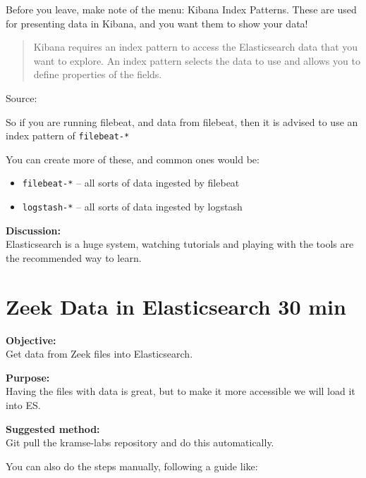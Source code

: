 \documentclass[a4paper,11pt,notitlepage]{report}
\begin{document}
Before you leave, make note of the menu: Kibana Index Patterns. These are used for presenting data in Kibana, and you want them to show your data!

\begin{quote}
Kibana requires an index pattern to access the Elasticsearch data that you want to explore. An index pattern selects the data to use and allows you to define properties of the fields.
\end{quote}
Source: 

So if you are running filebeat, and data from filebeat, then it is advised to use an index pattern of \verb+filebeat-*+


You can create more of these, and common ones would be:
\begin{itemize}
\item \verb+filebeat-*+ -- all sorts of data ingested by filebeat
\item \verb+logstash-*+ -- all sorts of data ingested by logstash

\end{itemize}

{\bf Discussion:}\\
Elasticsearch is a huge system, watching tutorials and playing with the tools are the recommended way to learn.



\chapter{Zeek Data in Elasticsearch 30 min}
\label{ex:zeek-json-es}

{\bf Objective:}\\
Get data from Zeek files into Elasticsearch.


{\bf Purpose:}\\
Having the files with data is great, but to make it more accessible we will load it into ES.


{\bf Suggested method:}\\
Git pull the kramse-labs repository and do this automatically.

You can also do the steps manually, following a guide like:\\

\end{document}
